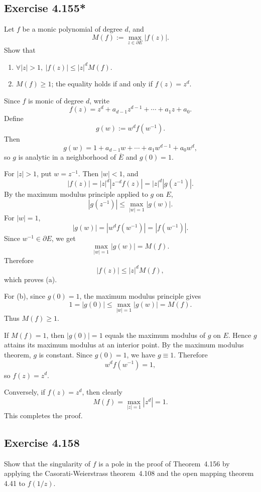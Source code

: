\documentclass{article}
\begin{document}
\subsection{Exercise 4.155*}
\label{sec:ca-ex-4-155-star}

Let $f$ be a monic polynomial of degree $d$, and
\[
  M(f):=\max_{z\in\partial E}|f(z)|.
\]
Show that

\begin{enumerate}
  \item[(a)] $\forall |z|>1,\ |f(z)|\le |z|^dM(f)$.
  \item[(b)] $M(f)\ge1$; the equality holds if and only if $f(z)=z^d$.
\end{enumerate}

\begin{solution}
  Since $f$ is monic of degree $d$, write
  \[
    f(z)=z^d+a_{d-1}z^{d-1}+\cdots+a_1z+a_0.
  \]
  Define
  \[
    g(w):=w^d f(w^{-1}).
  \]
  Then
  \[
    g(w)=1+a_{d-1}w+\cdots+a_1w^{d-1}+a_0w^d,
  \]
  so $g$ is analytic in a neighborhood of $\overline E$ and $g(0)=1$.

  For $|z|>1$, put $w=z^{-1}$. Then $|w|<1$, and
  \[
    |f(z)|=|z|^d |z^{-d}f(z)|
    =|z|^d |g(z^{-1})|.
  \]
  By the maximum modulus principle applied to $g$ on $E$,
  \[
    |g(z^{-1})|
    \le \max_{|w|=1}|g(w)|.
  \]
  For $|w|=1$,
  \[
    |g(w)|=|w^d f(w^{-1})|=|f(w^{-1})|.
  \]
  Since $w^{-1}\in\partial E$, we get
  \[
    \max_{|w|=1}|g(w)|=M(f).
  \]
  Therefore
  \[
    |f(z)|\le |z|^dM(f),
  \]
  which proves (a).

  For (b), since $g(0)=1$, the maximum modulus principle gives
  \[
    1=|g(0)|\le \max_{|w|=1}|g(w)|=M(f).
  \]
  Thus $M(f)\ge1$.

  If $M(f)=1$, then $|g(0)|=1$ equals the maximum modulus of $g$ on $E$.
  Hence $g$ attains its maximum modulus at an interior point. By the maximum
  modulus theorem, $g$ is constant. Since $g(0)=1$, we have $g\equiv1$.
  Therefore
  \[
    w^d f(w^{-1})=1,
  \]
  so $f(z)=z^d$.

  Conversely, if $f(z)=z^d$, then clearly
  \[
    M(f)=\max_{|z|=1}|z^d|=1.
  \]
  This completes the proof.
\end{solution}

\subsection{Exercise 4.158}

Show that the singularity of $f$ is a pole in the proof of Theorem~4.156 by
applying the Casorati-Weierstrass theorem~4.108 and the open mapping theorem
4.41 to $f(1/z)$.
\end{document}

